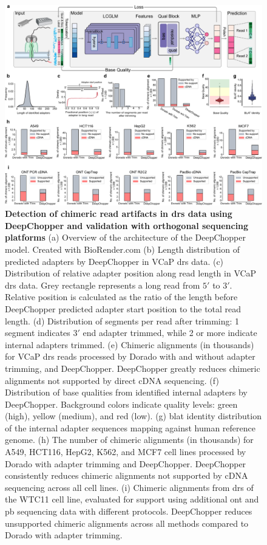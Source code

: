 \documentclass[pdflatex,sn-nature, lineno]{sn-jnl}%
\begin{document}
\begin{figure}[!ht]
	\includegraphics[height=0.78\columnwidth]{finals/figure1}
	\caption{{\bf Detection of chimeric read artifacts in \gls{drs} data using DeepChopper and validation with orthogonal sequencing platforms} (a) Overview of the architecture of the DeepChopper model. Created with BioRender.com (b) Length distribution of predicted adapters by DeepChopper in VCaP \gls{drs} data. (c) Distribution of relative adapter position along read length in VCaP \gls{drs} data. Grey rectangle represents a long read from $5'$ to $3'$. Relative position is calculated as the ratio of the length before DeepChopper predicted adapter start position to the total read length. (d) Distribution of segments per read after trimming: 1 segment indicates $3'$ end adapter trimmed, while 2 or more indicate internal adapters trimmed. (e) Chimeric alignments (in thousands) for VCaP \gls{drs} reads processed by Dorado with and without adapter trimming, and DeepChopper. DeepChopper greatly reduces chimeric alignments not supported by direct cDNA sequencing. (f) Distribution of base qualities from identified internal adapters by DeepChopper. Background colors indicate quality levels: green (high), yellow (medium), and red (low). (g) \gls{blat} identity distribution of the internal adapter sequences mapping against human reference genome. (h) The number of chimeric alignments (in thousands) for A549, HCT116, HepG2, K562, and MCF7 cell lines processed by Dorado with adapter trimming and DeepChopper. DeepChopper consistently reduces chimeric alignments not supported by cDNA sequencing across all cell lines. (i) Chimeric alignments from \gls{drs} of the WTC11 cell line, evaluated for support using additional \gls{ont} and \gls{pb} sequencing data with different protocols. DeepChopper reduces unsupported chimeric alignments across all methods compared to Dorado with adapter trimming.}\label{fig:f1}
\end{figure}
\end{document}
